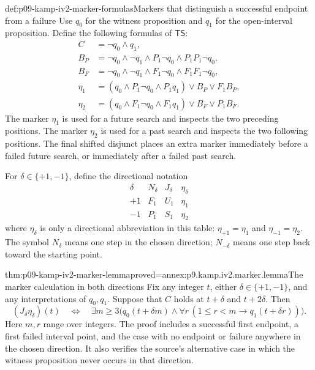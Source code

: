 \begin{hbdefinition}{def:p09-kamp-iv2-marker-formulas}{Markers that distinguish a successful endpoint from a failure}
Use \(q_0\) for the witness proposition and \(q_1\) for
the open-interval proposition. Define the following formulas of
\(\mathsf{TS}\):
\[
\begin{aligned}
 C&=\neg q_0\land q_1,\\
 B_P&=\neg q_0\land\neg q_1\land P_1\neg q_0
                                      \land P_1P_1\neg q_0,\\
 B_F&=\neg q_0\land\neg q_1\land F_1\neg q_0
                                      \land F_1F_1\neg q_0,\\
 \eta_1&=(q_0\land P_1\neg q_0\land P_1q_1)
                                      \lor B_P\lor F_1B_P,\\
 \eta_2&=(q_0\land F_1\neg q_0\land F_1q_1)
                                      \lor B_F\lor P_1B_F.
\end{aligned}
\]
The marker \(\eta_1\) is used for a future search and inspects
the two preceding positions. The marker \(\eta_2\) is used
for a past search and inspects the two following positions.
The final shifted disjunct places an extra marker immediately before
a failed future search, or immediately after a failed past search.

For \(\delta\in\{+1,-1\}\), define the directional notation
\[
\begin{array}{c|ccc}
 \delta&N_\delta&J_\delta&\eta_\delta\\ \hline
 +1&F_1&U_1&\eta_1\\
 -1&P_1&S_1&\eta_2
\end{array}
\]
where \(\eta_\delta\) is only a directional abbreviation in
this table: \(\eta_{+1}=\eta_1\) and
\(\eta_{-1}=\eta_2\). The symbol \(N_\delta\) means one
step in the chosen direction; \(N_{-\delta}\) means one step
back toward the starting point.
\end{hbdefinition}

\begin{hblemma}{thm:p09-kamp-iv2-marker-lemma}{proved=annex:p9.kamp.iv2.marker.lemma}{The marker calculation in both directions}
Fix any integer \(t\), either \(\delta\in\{+1,-1\}\),
and any interpretations of \(q_0,q_1\). Suppose that \(C\)
holds at \(t+\delta\) and \(t+2\delta\). Then
\[
 (J_\delta\eta_\delta)(t)
 \quad\Longleftrightarrow\quad
 \exists m\geq3\bigl(q_0(t+\delta m)\land
       \forall r\,(1\leq r<m\to q_1(t+\delta r))\bigr).
\]
Here \(m,r\) range over integers.
The proof includes a successful first endpoint, a first failed
interval point, and the case with no endpoint or failure anywhere
in the chosen direction. It also verifies the source's alternative
case in which the witness proposition never occurs in that direction.
\end{hblemma}

